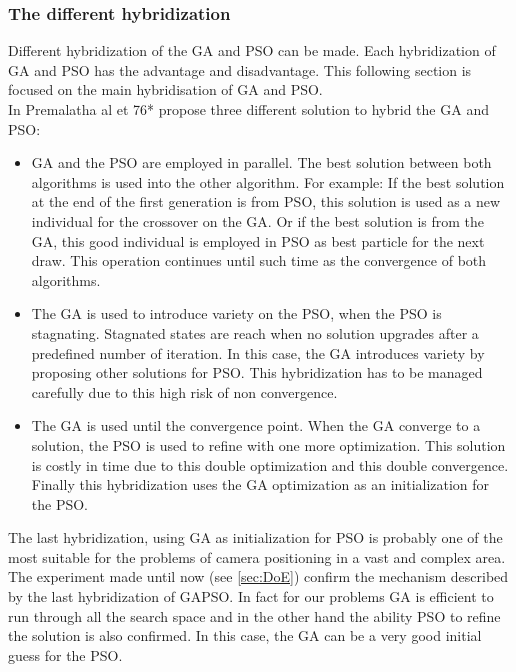\subsubsection{The different hybridization }

 Different hybridization of the GA and PSO can be made. Each hybridization of GA and PSO has the advantage and disadvantage. This following section is focused on the main hybridisation of GA and PSO. \\
In Premalatha al et 76* \citep{76*premalatha2009} propose three different solution to hybrid the GA and PSO: 
\begin{itemize}
\item  GA and the PSO are employed in parallel. The best solution between both algorithms is used into the other algorithm. 
For example: If the best solution at the end of the first generation is from PSO, this solution is used as a new individual for the crossover on the GA. Or if the best solution is from the GA, this good individual is employed in PSO as best particle for the next draw. This operation continues until such time as the convergence of both algorithms.   
 
\item The GA is used to introduce variety on the PSO, when the PSO is stagnating. Stagnated states are reach when no solution upgrades after a predefined number of iteration. In this case, the GA introduces variety by proposing other solutions for PSO. This hybridization has to be managed carefully due to this high risk of non convergence. 

\item The GA is used until the convergence point. When the GA converge to a solution, the PSO is used to refine with one more optimization. This solution is costly in time due to this double optimization and this double convergence. Finally this hybridization uses the GA optimization as an initialization for the PSO.\\
\end{itemize}

The last hybridization, using GA as initialization for PSO is probably one of the most suitable for the problems of camera positioning in a vast and complex area. 
The experiment made until now (see \ref{sec:DoE}) confirm the mechanism described by the last hybridization of GAPSO. In fact for our problems GA is efficient to run through all the search space and in the other hand the  ability PSO to refine the solution is also confirmed.  
In this case, the GA can be a very good initial guess for the PSO. \\

